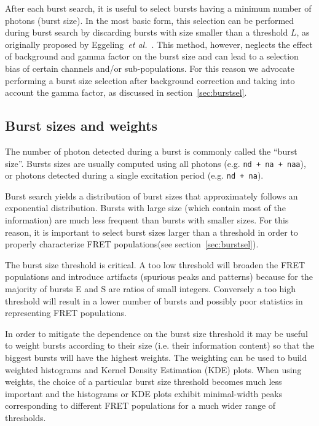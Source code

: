After each burst search, it is useful to select
bursts having a minimum number of photons (burst size). In the most
basic form, this selection can be performed during burst search by discarding
bursts with size smaller than a threshold $L$, as originally proposed by
Eggeling~\textit{et al.}~\cite{Eggeling_1998}.
This method, however, neglects the effect
of background and gamma factor on the burst size and can lead to a selection
bias of certain channels and/or sub-populations.
For this reason we advocate performing a burst size selection after background
correction and taking into account the gamma factor, as discussed in
section~\ref{sec:burstsel}.


\subsection{Burst sizes and weights}
The number of photon detected during a burst is commonly called the ``burst size''.
Bursts sizes are usually computed using all photons (e.g. \verb|nd + na + naa|), 
or photons detected during a single excitation period (e.g. \verb|nd + na|).

Burst search yields a distribution of burst sizes that approximately 
follows an exponential distribution.
Bursts with large size (which contain most of the information)
are much less frequent than bursts with smaller sizes. For this reason, it is 
important to select burst sizes larger than a threshold in order
to properly characterize FRET populations(see section~\ref{sec:burstsel}). 


The burst size threshold is critical.
A too low threshold will broaden the FRET populations and introduce
artifacts (spurious peaks and patterns) because for the majority of bursts
E and S are ratios of small integers. 
Conversely a too high threshold will result in a lower number of bursts 
and possibly poor statistics in representing FRET populations.

In order to mitigate the dependence on the burst size threshold it may be
useful to weight bursts according to their size (i.e. their
information content) so that the biggest bursts will have the highest weights.
The weighting can be used to build weighted histograms and Kernel Density Estimation (KDE) plots.
When using weights, the choice of a particular burst size threshold becomes
much less important and the histograms or KDE plots exhibit minimal-width
peaks corresponding to different FRET populations for a much wider range
of thresholds.

